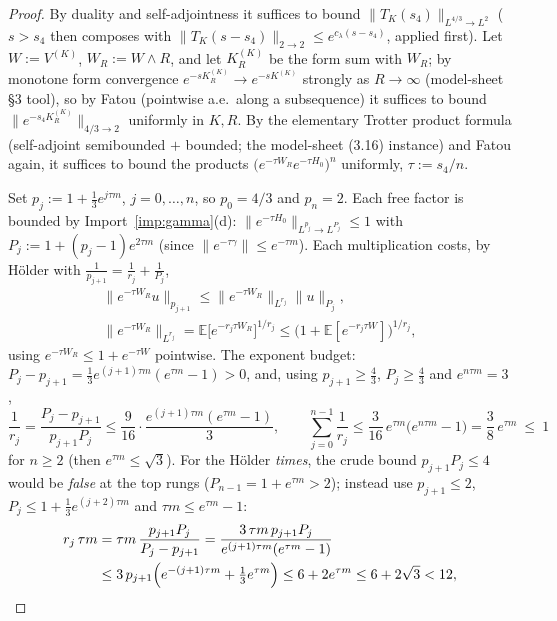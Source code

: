 \documentclass[11pt,a4paper]{article}
\theoremstyle{plain}
\theoremstyle{definition}
\newcommand{\E}{\mathbb{E}}
\begin{document}
\begin{proof}
By duality and self-adjointness it suffices to bound
$\|T_K(s_4)\|_{L^{4/3}\to L^2}$ ($s>s_4$ then composes with
$\|T_K(s-s_4)\|_{2\to2}\le e^{c_\lambda(s-s_4)}$, applied first). Let
$W:=V^{(K)}$, $W_R:=W\wedge R$, and let $K^{(K)}_R$ be the form sum with
$W_R$; by monotone form convergence $e^{-sK^{(K)}_R}\to e^{-sK^{(K)}}$
strongly as $R\to\infty$ (model-sheet \S3 tool), so by Fatou (pointwise
a.e.\ along a subsequence) it suffices to bound
$\|e^{-s_4K^{(K)}_R}\|_{4/3\to2}$ uniformly in $K,R$. By the elementary
Trotter product formula (self-adjoint semibounded $+$ bounded; the
model-sheet (3.16) instance) and Fatou again, it suffices to bound the
products $\bigl(e^{-\tau W_R}e^{-\tau H_0}\bigr)^n$ uniformly, $\tau
:=s_4/n$.

Set $p_j:=1+\tfrac13e^{j\tau m}$, $j=0,\dots,n$, so $p_0=4/3$ and
$p_n=2$. Each free factor is bounded by Import~\ref{imp:gamma}(d):
$\|e^{-\tau H_0}\|_{L^{p_j}\to L^{P_j}}\le1$ with
$P_j:=1+(p_j-1)e^{2\tau m}$ (since $\|e^{-\tau\gamma}\|\le e^{-\tau
m}$). Each multiplication costs, by H\"older with
$\tfrac1{p_{j+1}}=\tfrac1{r_j}+\tfrac1{P_j}$,
\[
 \begin{gathered}
 \bigl\|e^{-\tau W_R}u\bigr\|_{p_{j+1}}
 \le\bigl\|e^{-\tau W_R}\bigr\|_{L^{r_j}}\|u\|_{P_j},\\
 \bigl\|e^{-\tau W_R}\bigr\|_{L^{r_j}}
 =\E\bigl[e^{-r_j\tau W_R}\bigr]^{1/r_j}
 \le\bigl(1+\E[e^{-r_j\tau W}]\bigr)^{1/r_j},
 \end{gathered}
\]
using $e^{-\tau W_R}\le1+e^{-\tau W}$ pointwise. The exponent budget: $P_j-p_{j+1}=\tfrac13e^{(j+1)\tau m}(e^{\tau m}-1)>0$,
and, using $p_{j+1}\ge\tfrac43$, $P_j\ge\tfrac43$ and $e^{n\tau m}=3$,
\[
 \frac1{r_j}=\frac{P_j-p_{j+1}}{p_{j+1}P_j}
 \le\frac{9}{16}\cdot\frac{e^{(j+1)\tau m}(e^{\tau m}-1)}{3},
 \qquad
 \sum_{j=0}^{n-1}\frac1{r_j}
 \le\frac{3}{16}\,e^{\tau m}\bigl(e^{n\tau m}-1\bigr)
 =\frac38\,e^{\tau m}\ \le\ 1
\]
for $n\ge2$ (then $e^{\tau m}\le\sqrt3$). For the H\"older \emph{times}, the
crude bound $p_{j+1}P_j\le4$ would be \emph{false} at the top rungs
($P_{n-1}=1+e^{\tau m}>2$); instead use $p_{j+1}\le2$,
$P_j\le1+\tfrac13e^{(j+2)\tau m}$ and $\tau m\le e^{\tau m}-1$:
\begin{align*}
 r_j\,\tau m&=\tau m\,\frac{p_{j+1}P_j}{P_j-p_{j+1}}
 =\frac{3\,\tau m\,p_{j+1}P_j}{e^{(j+1)\tau m}(e^{\tau m}-1)}\\
 &\le3\,p_{j+1}\Bigl(e^{-(j+1)\tau m}+\tfrac13e^{\tau m}\Bigr)
 \le6+2e^{\tau m}\le6+2\sqrt3<12 ,
\end{align*}

\end{proof}
\end{document}
